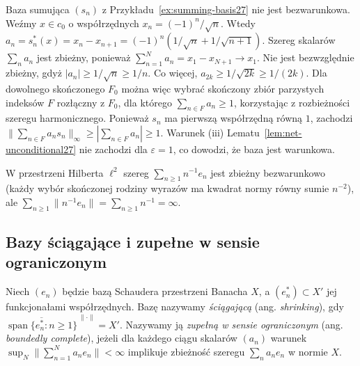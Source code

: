 \begin{przyklad}
\label{ex:conditional-summing27}
Baza sumująca $(s_n)$ z Przykładu~\ref{ex:summing-basis27}
nie jest bezwarunkowa. Weźmy $x\in c_0$ o współrzędnych
$x_n=(-1)^n/\sqrt n$. Wtedy
$a_n=s_n^*(x)=x_n-x_{n+1}=(-1)^n(1/\sqrt n+1/\sqrt{n+1})$.
Szereg skalarów $\sum_n a_n$ jest zbieżny, ponieważ
$\sum_{n=1}^Na_n=x_1-x_{N+1}\to x_1$.
Nie jest bezwzględnie zbieżny, gdyż
$|a_n|\ge1/\sqrt n\ge1/n$.
Co więcej, $a_{2k}\ge1/\sqrt{2k}\ge1/(2k)$.
Dla dowolnego skończonego $F_0$ można więc wybrać
skończony zbiór parzystych indeksów $F$ rozłączny z $F_0$,
dla którego $\sum_{n\in F}a_n\ge1$, korzystając z rozbieżności
szeregu harmonicznego. Ponieważ $s_n$ ma pierwszą
współrzędną równą $1$, zachodzi
$\|\sum_{n\in F}a_ns_n\|_\infty\ge|\sum_{n\in F}a_n|\ge1$.
Warunek (iii) Lematu~\ref{lem:net-unconditional27} nie zachodzi
dla $\varepsilon=1$, co dowodzi, że baza jest warunkowa.
\end{przyklad}

\begin{przyklad}
\label{ex:not-absolute27}
W przestrzeni Hilberta $\ell^2$ szereg
$\sum_{n\ge1}n^{-1}e_n$ jest zbieżny bezwarunkowo
(każdy wybór skończonej rodziny wyrazów ma kwadrat
normy równy sumie $n^{-2}$), ale
$\sum_{n\ge1}\|n^{-1}e_n\|=\sum_{n\ge1}n^{-1}=\infty$.
\end{przyklad}

\subsection{Bazy ściągające i zupełne w sensie ograniczonym}

\begin{definicja}
\label{def:shrinking-bcomplete27}
Niech $(e_n)$ będzie bazą Schaudera przestrzeni Banacha $X$,
a $(e_n^*)\subset X'$ jej funkcjonałami współrzędnych.
Bazę nazywamy \emph{ściągającą} (ang. \emph{shrinking}), gdy
$\overline{\operatorname{span}\{e_n^*:n\ge1\}}^{\,\|\cdot\|}=X'$.
Nazywamy ją \emph{zupełną w sensie ograniczonym}
(ang. \emph{boundedly complete}), jeżeli dla każdego ciągu
skalarów $(a_n)$ warunek
$\sup_N\|\sum_{n=1}^Na_ne_n\|<\infty$
implikuje zbieżność szeregu $\sum_na_ne_n$ w normie $X$.
\end{definicja}

